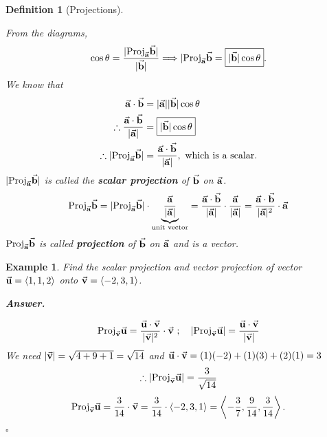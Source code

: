 \documentclass[12pt,a4paper]{article}
\newtheorem{df}{Definition}[subsection]
\newtheorem{eg}{Example}[subsection]
\newenvironment*{ans}{\par\indent\textbf{\textit{Answer. }}\par}{\par\hfill{$\square$}\par}
\def\Proj{\mathrm{Proj}}
\def\vecv{\va{v}}
\def\vecu{\va{u}}
\def\veca{\va{a}}
\def\vecb{\va{b}}
\begin{document}
\begin{df}[Projections]
\begin{center}
	\end{center}
	From the diagrams, \[\cos\theta=\frac{|\Proj_{\veca}\vecb|}{|\vecb|}\Longrightarrow|\Proj_{\veca}\vecb=\boxed{|\vecb|\cos\theta}.\]
	We know that \[\begin{aligned}
		\veca\cdot\vecb&=|\veca||\vecb|\cos\theta\\
		\therefore\frac{\veca\cdot\vecb}{|\veca|}&=\boxed{|\vecb|\cos\theta}\\
		\therefore |\Proj_{\veca}\vecb|&=\frac{\veca\cdot\vecb}{|\veca|},\text{ which is a scalar.}
	\end{aligned}\]
	$|\Proj_{\veca}\vecb|$ is called the \textbf{scalar projection} of $\vecb$ on $\veca$.
	\[\Proj_{\veca}\vecb=|\Proj_{\veca}\vecb|\cdot\underbrace{\frac{\veca}{|\veca|}}_{\text{unit vector}}=\frac{\veca\cdot\vecb}{|\veca|}\cdot\frac{\veca}{|\veca|}=\frac{\veca\cdot\vecb}{|\veca|^2}\cdot\veca\]
	$\Proj_{\veca}\vecb$ is called \textbf{projection} of $\vecb$ on $\veca$ and is a vector. 
\end{df}
\begin{eg}
	Find the scalar projection and vector projection of vector $\vecu=\langle1,1,2\rangle$ onto $\vecv=\langle-2,3,1\rangle$.
	\begin{ans}
		\[\Proj_{\vecv}\vecu=\frac{\vecu\cdot\vecv}{|\vecv|^2}\cdot\vecv\ ;\quad |\Proj_{\vecv}\vecu|=\frac{\vecu\cdot\vecv}{|\vecv|}\]
		We need $|\vecv|=\sqrt{4+9+1}=\sqrt{14}$ and $\vecu\cdot\vecv=(1)(-2)+(1)(3)+(2)(1)=3$
		\[\therefore |\Proj_{\vecv}\vecu|=\frac{3}{\sqrt{14}}\]
		\[\Proj_{\vecv}\vecu=\frac{3}{14}\cdot\vecv=\frac{3}{14}\cdot\langle-2,3,1\rangle=\left\langle-\frac{3}{7},\frac{9}{14},\frac{3}{14}\right\rangle.\]
	\end{ans}
\end{eg}
\end{document}

